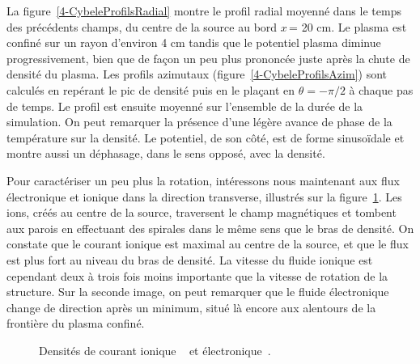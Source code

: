 \begin{refsection}
La figure~\ref{4-CybeleProfilsRadial} montre le profil radial moyenné dans le
temps des précédents champs, du centre de la source au bord $x\,$= 20 cm. Le
plasma est confiné sur un rayon d'environ 4 cm tandis que le potentiel plasma
diminue progressivement, bien que de façon un peu plus prononcée juste après la
chute de densité du plasma. 
Les profils azimutaux (figure~\ref{4-CybeleProfilsAzim})  sont calculés en
repérant le pic de densité puis en le plaçant en $\theta=-\pi/2$ à chaque pas de temps. Le profil
est ensuite moyenné sur l'ensemble de la durée de la simulation.
On peut remarquer la présence d'une légère avance de phase de la température
sur la densité. Le potentiel, de son côté, est de forme sinusoïdale et montre
aussi un déphasage, dans le sens opposé, avec la densité.

Pour caractériser un peu plus la rotation, intéressons nous
maintenant aux flux électronique et ionique dans la direction
transverse, illustrés sur la figure~\ref{4-CybeleCarteFlux}.
Les ions, créés au centre de la source, traversent le champ magnétiques et
tombent aux parois en effectuant des spirales dans le même sens que le bras de
densité. On constate que le courant ionique est maximal au centre de la source,
et que le flux est plus fort au niveau du bras de densité. La
vitesse du fluide ionique est cependant deux à trois fois moins importante que la vitesse de rotation de
la structure. Sur la seconde image, on peut remarquer que le fluide électronique
change de direction après un minimum, situé là encore aux alentours de la
frontière du plasma confiné.

\begin{figure}[!htbp]
  \centering
    \caption{Densités de courant ionique
    ~ et électronique~.}
    \label{4-CybeleCarteFlux}
\end{figure}


\end{refsection}
